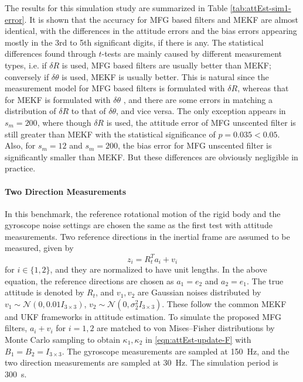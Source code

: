 The results for this simulation study are summarized in Table \ref{tab:attEst-sim1-error}.
It is shown that the accuracy for MFG based filters and MEKF are almost identical, with the differences in the attitude errors and the bias errors appearing mostly in the 3rd to 5th significant digits, if there is any.
The statistical differences found through $t$-tests are mainly caused by different measurement types, i.e. if $\delta R$ is used, MFG based filters are usually better than MEKF; conversely if $\delta\theta$ is used, MEKF is usually better.
This is natural since the measurement model for MFG based filters is formulated with $\delta R$, whereas that for MEKF is formulated with $\delta\theta$ \cite{lefferts1982kalman}, and there are some errors in matching a distribution of $\delta R$ to that of $\delta\theta$, and vice versa.
The only exception appears in $s_m=200$, where though $\delta R$ is used, the attitude error of MFG unscented filter is still greater than MEKF with the statistical significance of $p=0.035<0.05$.
Also, for $s_m=12$ and $s_m=200$, the bias error for MFG unscented filter is significantly smaller than MEKF.
But these differences are obviously negligible in practice.

\paragraph{Two Direction Measurements}

In this benchmark, the reference rotational motion of the rigid body and the gyroscope noise settings are chosen the same as the first test with attitude measurements.
Two reference directions in the inertial frame are assumed to be measured, given by
\begin{equation}
	z_{i} = R_t^T a_{i} + v_{i}
\end{equation}
for $i\in\{1,2\}$, and they are normalized to have unit lengths.
In the above equation, the reference directions are chosen as $a_1=e_2$ and $a_2=e_1$.
The true attitude is denoted by $R_t$, and $v_1,v_2$ are Gaussian noises distributed by $v_1 \sim \mathcal{N}(0,0.01I_{3\times3})$, $v_2 \sim \mathcal{N}(0,\sigma_2^2I_{3\times3})$. 
These follow the common MEKF and UKF frameworks in attitude estimation.
To simulate the proposed MFG filters, $a_i+v_i$ for $i=1,2$ are matched to von Mises--Fisher distributions by Monte Carlo sampling to obtain $\kappa_1,\kappa_2$ in \eqref{eqn:attEst-update-F} with $B_1 = B_2 = I_{3\times 3}$.
The gyroscope measurements are sampled at \SI{150}{\hertz}, and the two direction measurements are sampled at \SI{30}{\hertz}.
The simulation period is \SI{300}{\second}.

